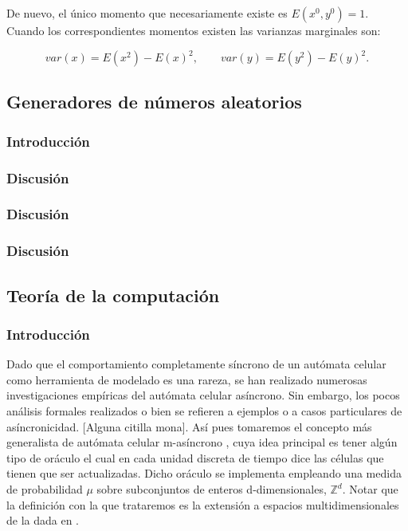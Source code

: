 \documentclass[../proyecto.tex]{memoir}
\begin{document}
De nuevo, el único momento que necesariamente existe es $E(x^{0},y^{0})=1$. Cuando los correspondientes momentos existen las varianzas marginales son:

\begin{equation*}
var(x) =  E(x^{2})-E(x)^{2}, \qquad var(y) =  E(y^{2})-E(y)^{2}.
\end{equation*}



\subsection{Generadores de números aleatorios}

\subsubsection{Introducción}

\subsubsection{Discusión}

\subsubsection{Discusión}

\subsubsection{Discusión}


\subsection{Teoría de la computación}

\subsubsection{Introducción}
Dado que el comportamiento completamente síncrono de un autómata celular como herramienta de modelado es una rareza, se han realizado numerosas investigaciones empíricas del autómata celular asíncrono. Sin embargo, los pocos análisis formales realizados o bien se refieren a ejemplos o a casos particulares de asíncronicidad. [Alguna citilla mona]. Así pues tomaremos el concepto más generalista de autómata celular m-asíncrono \cite{oraculo}, cuya idea principal es tener algún tipo de oráculo el cual en cada unidad discreta de tiempo dice las células que tienen que ser actualizadas. Dicho oráculo se implementa empleando una medida de probabilidad $\mu$ sobre subconjuntos de enteros d-dimensionales, $\mathds{Z}^{d}$. Notar que la definición con la que trataremos es la extensión a espacios multidimensionales de la dada en \cite{oraculo}.
\end{document}
